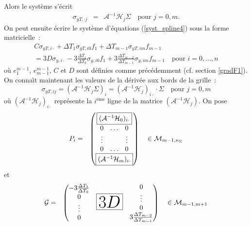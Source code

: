 \setlength{\fboxsep}{3pt}
\setcounter{MaxMatrixCols}{10}
Alors le syst\`eme s'\'ecrit
\begin{eqnarray}
\sigma_{yT,\cdot j} &=& \mathcal{A}^{-1}\mathcal{H}_j\Sigma 
\quad \text{pour } j=0,m.\label{R4_1}
\end{eqnarray}
On peut ensuite \'ecrire le syst\`eme d'\'equations 
(\ref{syst_spline4}) sous la forme matricielle~:
\begin{multline*}
C\sigma_{yT,i \cdot} + \Delta T_1 \sigma_{yT,i0}f_1 + 
\Delta T_{m-1} \sigma_{yT,im}f_{m-1}\\
= 3D\sigma_{y,i \cdot} - 3\frac{\Delta T_1}{\Delta T_0}
\sigma_{y,i0}f_1 + 3\frac{\Delta T_{m-2}}{\Delta T_{m-1}}
\sigma_{y,im}f_{m-1} \quad \text{pour } i=0,...,n
\end{multline*}
o\`u $e^{m-1}_1$, $e^{m-1}_{m-1}$, $C$ et $D$ sont d\'efinies 
comme pr\'ec\'edemment (cf. section \ref{gradF1}). On conna\^{\i}t 
maintenant les valeurs de la d\'eriv\'ee aux bords de la grille~:
\begin{equation*}
\sigma_{yT,ij} = (\mathcal{A}^{-1}\mathcal{H}_j\Sigma)_i = 
(\mathcal{A}^{-1}\mathcal{H}_j)_{i\cdot} \cdot \Sigma 
\quad \text{pour } j=0,m 
\end{equation*}
o\`u $(\mathcal{A}^{-1}\mathcal{H}_j)_{i\cdot}$ repr\'esente la 
$i^{\text{\`eme}}$ ligne de la matrice 
$(\mathcal{A}^{-1}\mathcal{H}_j)$. On pose
\begin{eqnarray*}
P_i &=& \begin{pmatrix}
\fbox{$(\mathcal{A}^{-1}\mathcal{H}_0)_{i\cdot}$}\\
\begin{matrix}
0&\hdots&0\\
\vdots&&\vdots\\
0&\hdots&0
\end{matrix}\\
\fbox{$(\mathcal{A}^{-1}\mathcal{H}_m)_{i\cdot}$}
\end{pmatrix} \quad \in \mathcal{M}_{m-1,n_{\Sigma}}
\end{eqnarray*}
et
\setlength{\fboxsep}{24pt}
\begin{eqnarray*}
\mathcal{G} &=& \begin{pmatrix} 
\begin{matrix} -3\frac{\Delta T_1}{\Delta T_0}\\0\\ \vdots\\0 
\end{matrix} & \raisebox{-1ex}{\fbox{\Huge $3D$}} & 
\begin{matrix} 0\\ \vdots\\0 \\ 
3\frac{\Delta T_{m-2}}{\Delta T_{m-1}} 
\end{matrix}\\
\end{pmatrix} \quad \in \mathcal{M}_{m-1,m+1}
\end{eqnarray*}
